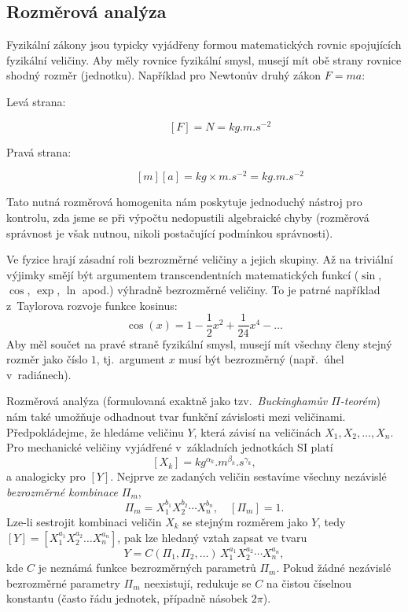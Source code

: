 \subsection{Rozměrová analýza}

Fyzikální zákony jsou typicky vyjádřeny formou matematických rovnic spojujících fyzikální veličiny. Aby měly rovnice fyzikální smysl, musejí mít obě strany rovnice shodný rozměr (jednotku). Například pro Newtonův druhý zákon $F = ma$:
\begin{description}
    \item[Levá strana:] $$ [F] = \unit{N} = \unit{kg.m.s^{-2}} $$
    \item[Pravá strana:] $$ [m][a] = \unit{kg} \times \unit{m.s^{-2}} = \unit{kg.m.s^{-2}} $$
\end{description}
Tato nutná rozměrová homogenita nám poskytuje jednoduchý nástroj pro kontrolu, zda jsme se při výpočtu nedopustili algebraické chyby (rozměrová správnost je však nutnou, nikoli postačující podmínkou správnosti).

Ve fyzice hrají zásadní roli bezrozměrné veličiny a jejich skupiny. Až na triviální výjimky smějí být argumentem transcendentních matematických funkcí ($\sin$, $\cos$, $\exp$, $\ln$ apod.) výhradně bezrozměrné veličiny. To je patrné například z~Taylorova rozvoje funkce kosinus:
$$ \cos(x) = 1 - \frac{1}{2}x^2 + \frac{1}{24}x^4 - \dots $$
Aby měl součet na pravé straně fyzikální smysl, musejí mít všechny členy stejný rozměr jako číslo $1$, tj.~argument $x$ musí být bezrozměrný (např.~úhel v~radiánech).

Rozměrová analýza (formulovaná exaktně jako tzv.~\emph{Buckinghamův $\Pi$-teorém}) nám také umožňuje odhadnout tvar funkční závislosti mezi veličinami. Předpokládejme, že hledáme veličinu $Y$, která závisí na veličinách $X_1, X_2, \dots, X_n$. Pro mechanické veličiny vyjádřené v~základních jednotkách SI platí
$$ [X_k] = \unit{kg^{\alpha_k}.m^{\beta_k}.s^{\gamma_k}}, $$
a analogicky pro $[Y]$. Nejprve ze zadaných veličin sestavíme všechny nezávislé \emph{bezrozměrné kombinace} $\Pi_m$,
$$ \Pi_m = X_1^{b_1} X_2^{b_2} \cdots X_n^{b_n}, \quad [\Pi_m] = 1. $$
Lze-li sestrojit kombinaci veličin $X_k$ se stejným rozměrem jako $Y$, tedy $[Y] = [X_1^{a_1} X_2^{a_2} \dots X_n^{a_n}]$, pak lze hledaný vztah zapsat ve tvaru
$$ Y = C(\Pi_1, \Pi_2, \dots)\, X_1^{a_1} X_2^{a_2} \cdots X_n^{a_n}, $$
kde $C$ je neznámá funkce bezrozměrných parametrů $\Pi_m$. Pokud žádné nezávislé bezrozměrné parametry $\Pi_m$ neexistují, redukuje se $C$ na čistou číselnou konstantu (často řádu jednotek, případně násobek $2\pi$).

